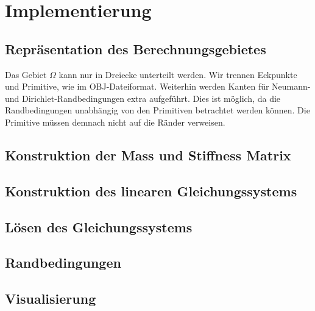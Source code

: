 \documentclass[crop=false,10pt,ngerman]{standalone}
\begin{document}
  \section{Implementierung} %
  \label{sec:implementierung}

    \subsection{Repräsentation des Berechnungsgebietes} %
    \label{sub:repräsentation_des_berechnungsgebietes}
      Das Gebiet $\Omega$ kann nur in Dreiecke unterteilt werden.
      Wir trennen Eckpunkte und Primitive, wie im OBJ-Dateiformat.
      Weiterhin werden Kanten für Neumann- und Dirichlet-Randbedingungen extra aufgeführt.
      Dies ist möglich, da die Randbedingungen unabhängig von den Primitiven betrachtet werden können.
      Die Primitive müssen demnach nicht auf die Ränder verweisen.
      \cite{Alberty1998}

    \subsection{Konstruktion der Mass und Stiffness Matrix} %
    \label{sub:konstruktion_der_mass_und_stiffness_matrix}


    \subsection{Konstruktion des linearen Gleichungssystems} %
    \label{sub:konstruktion_des_linearen_gleichungssystems}


    \subsection{Lösen des Gleichungssystems} %
    \label{sub:lösen_des_gleichungssystems}


    \subsection{Randbedingungen} %
    \label{sub:randbedingungen}


    \subsection{Visualisierung} %
    \label{sub:visualisierung}

\end{document}
